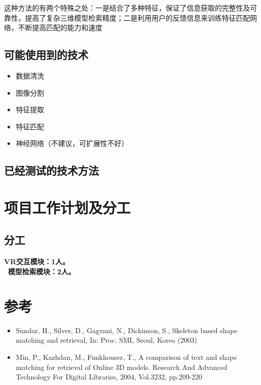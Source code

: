 \documentclass{article}
\begin{document}
这种方法的有两个特殊之处：一是结合了多种特征，保证了信息获取的完整性及可靠性，提高了复杂三维模型检索精度；二是利用用户的反馈信息来训练特征匹配网络，不断提高匹配的能力和速度
\subsection{可能使用到的技术}
\begin{itemize}
    \item 数据清洗
    \item 图像分割
    \item 特征提取
    \item 特征匹配
    \item 神经网络（不建议，可扩展性不好）
\end{itemize}
\subsection{已经测试的技术方法}

\section{项目工作计划及分工}
\subsection{分工}
\paragraph{VR交互模块：1人。 \\\ 模型检索模块：2人。
}

\section{参考}
\begin{itemize}
    \item Sundar, H., Silver, D., Gagvani, N., Dickinson, S., Skeleton based shape matching and retrieval, In: Proc. SMI, Seoul, Korea (2003)
    \item Min, P., Kazhdan, M., Funkhouser, T., A comparison of text and shape matching for retrieval of Online 3D models. Research And Advanced Technology For Digital Libraries, 2004, Vol.3232, pp.209-220
\end{itemize}
\end{document}
